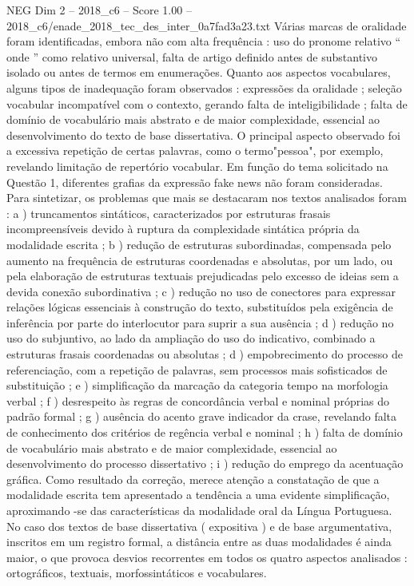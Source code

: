 \begin{textsample}{NEG Dim 2 – 2018\_c6 – Score 1.00 – 2018\_c6/enade\_2018\_tec\_des\_inter\_0a7fad3a23.txt}
Várias marcas de oralidade foram identificadas, embora não com alta frequência : uso do pronome relativo “ onde ” como relativo universal, falta de artigo definido antes de substantivo isolado ou antes de termos em enumerações.
Quanto aos aspectos vocabulares, alguns tipos de inadequação foram observados : expressões da oralidade ; seleção vocabular incompatível com o contexto, gerando falta de inteligibilidade ; falta de domínio de vocabulário mais abstrato e de maior complexidade, essencial ao desenvolvimento do texto de base dissertativa.
O principal aspecto observado foi a excessiva repetição de certas palavras, como o termo"pessoa", por exemplo, revelando limitação de repertório vocabular.
Em função do tema solicitado na Questão 1, diferentes grafias da expressão fake news não foram consideradas.
Para sintetizar, os problemas que mais se destacaram nos textos analisados foram : a ) truncamentos sintáticos, caracterizados por estruturas frasais incompreensíveis devido à ruptura da complexidade sintática própria da modalidade escrita ; b ) redução de estruturas subordinadas, compensada pelo aumento na frequência de estruturas coordenadas e absolutas, por um lado, ou pela elaboração de estruturas textuais prejudicadas pelo excesso de ideias sem a devida conexão subordinativa ; c ) redução no uso de conectores para expressar relações lógicas essenciais à construção do texto, substituídos pela exigência de inferência por parte do interlocutor para suprir a sua ausência ; d ) redução no uso do subjuntivo, ao lado da ampliação do uso do indicativo, combinado a estruturas frasais coordenadas ou absolutas ; d ) empobrecimento do processo de referenciação, com a repetição de palavras, sem processos mais sofisticados de substituição ; e ) simplificação da marcação da categoria tempo na morfologia verbal ; f ) desrespeito às regras de concordância verbal e nominal próprias do padrão formal ; g ) ausência do acento grave indicador da crase, revelando falta de conhecimento dos critérios de regência verbal e nominal ; h ) falta de domínio de vocabulário mais abstrato e de maior complexidade, essencial ao desenvolvimento do processo dissertativo ; i ) redução do emprego da acentuação gráfica.
Como resultado da correção, merece atenção a constatação de que a modalidade escrita tem apresentado a tendência a uma evidente simplificação, aproximando -se das características da modalidade oral da Língua Portuguesa.
No caso dos textos de base dissertativa ( expositiva ) e de base argumentativa, inscritos em um registro formal, a distância entre as duas modalidades é ainda maior, o que provoca desvios recorrentes em todos os quatro aspectos analisados : ortográficos, textuais, morfossintáticos e vocabulares.

\end{textsample}
